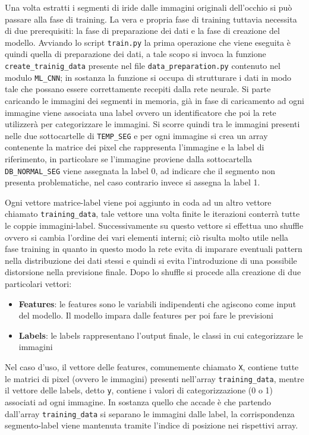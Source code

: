 Una volta estratti i segmenti di iride dalle immagini originali dell’occhio si può passare alla fase di training. La vera e propria fase di training tuttavia necessita di due prerequisiti: la fase di preparazione dei dati e la fase di creazione del modello. Avviando lo script \texttt{train.py} la prima operazione che viene eseguita è quindi quella di preparazione dei dati, a tale scopo si invoca la funzione \texttt{create\_trainig\_data} presente nel file \texttt{data\_preparation.py} contenuto nel modulo \texttt{ML\_CNN}; in sostanza la funzione si occupa di strutturare i dati in modo tale che possano essere correttamente recepiti dalla rete neurale. Si parte caricando le immagini dei segmenti in memoria, già in fase di caricamento ad ogni immagine viene associata una label ovvero un identificatore che poi la rete utilizzerà per categorizzare le immagini. Si scorre quindi tra le immagini presenti nelle due sottocartelle di \texttt{TEMP\_SEG}  e per ogni immagine si crea un array contenente la matrice dei pixel che rappresenta l’immagine e la label di riferimento, in particolare se l’immagine proviene dalla sottocartella \texttt{DB\_NORMAL\_SEG} viene assegnata la label 0, ad indicare che il segmento non presenta problematiche, nel caso contrario invece si assegna la label 1. 

Ogni vettore matrice-label viene poi aggiunto in coda ad un altro vettore chiamato \texttt{training\_data}, tale vettore una volta finite le iterazioni conterrà tutte le coppie immagini-label. Successivamente su questo vettore si effettua uno shuffle ovvero si cambia l’ordine dei vari elementi interni;  ciò risulta molto utile nella fase training in quanto in questo modo la rete evita di imparare eventuali pattern nella distribuzione dei dati stessi e quindi si evita l’introduzione di una possibile distorsione nella previsione finale. Dopo lo shuffle si procede alla creazione di due particolari vettori:

\begin{itemize}
  \item \textbf{Features}: le features sono le variabili indipendenti che agiscono come input del modello. Il modello impara dalle features per poi fare le previsioni
  \item \textbf{Labels}: le labels rappresentano l’output finale, le classi in cui categorizzare le immagini
\end{itemize}

Nel caso d’uso, il vettore delle features, comunemente chiamato \texttt{X}, contiene tutte le matrici di pixel (ovvero le immagini) presenti nell’array \texttt{training\_data}, mentre il vettore delle labels, detto \texttt{y}, contiene i valori di categorizzazione (0 o 1) associati ad ogni immagine. In sostanza quello che accade è che partendo dall’array \texttt{training\_data} si separano le immagini dalle label, la corrispondenza segmento-label viene mantenuta tramite l’indice di posizione nei rispettivi array. 

